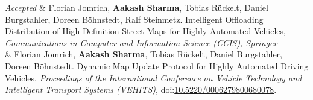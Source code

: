 \documentclass[11pt, a4paper]{article}
\newcommand{\DOI}[1]{doi:\href{https://doi.org/#1}{#1}}
\newcommand{\Year}[1]{\fontsize{10pt}{0}\selectfont #1}
\begin{document}
\begin{EntriesTable}
\Year{\textit{Accepted}}  &
    Florian Jomrich, \textbf{Aakash Sharma}, Tobias R{\"u}ckelt, Daniel Burgstahler, Doreen B{\"o}hnstedt, Ralf Steinmetz.
    Intelligent Offloading Distribution of High Definition Street Maps for Highly Automated Vehicles,
    \emph{Communications in Computer and Information Science (CCIS), Springer}
   \\
\Year{2017}  &
    Florian Jomrich, \textbf{Aakash Sharma}, Tobias R{\"u}ckelt, Daniel Burgstahler, Doreen B{\"o}hnstedt.
    Dynamic Map Update Protocol for Highly Automated Driving Vehicles,
    \emph{Proceedings of the International Conference on Vehicle Technology and Intelligent Transport Systems (VEHITS)},
    \DOI{10.5220/0006279800680078}.
    \\
\end{EntriesTable}

\iffalse
\end{document}

